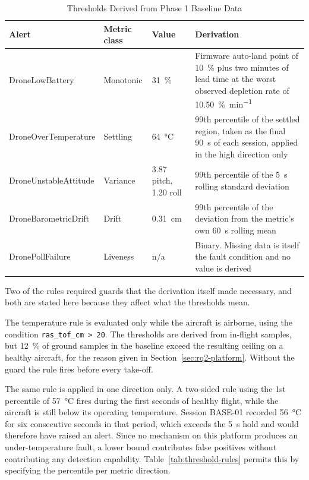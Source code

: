 \begin{table}[htbp]
\centering
\caption{Thresholds Derived from Phase 1 Baseline Data}
\label{tab:derived-thresholds}
\footnotesize
\begin{tabular}{|p{2.4cm}|p{2.2cm}|p{2.0cm}|p{6.4cm}|}
\hline
\textbf{Alert} & \textbf{Metric class} & \textbf{Value} & \textbf{Derivation} \\
\hline
DroneLowBattery & Monotonic & \SI{31}{\percent} &
Firmware auto-land point of \SI{10}{\percent} plus two minutes of lead time at
the worst observed depletion rate of \SI{10.50}{\percent\per\minute} \\
\hline
DroneOverTemperature & Settling & \SI{64}{\celsius} &
99th percentile of the settled region, taken as the final \SI{90}{\second} of
each session, applied in the high direction only \\
\hline
DroneUnstableAttitude & Variance & 3.87 pitch, 1.20 roll &
99th percentile of the \SI{5}{\second} rolling standard deviation \\
\hline
DroneBarometricDrift & Drift & \SI{0.31}{\centi\metre} &
99th percentile of the deviation from the metric's own \SI{60}{\second} rolling
mean \\
\hline
DronePollFailure & Liveness & n/a &
Binary. Missing data is itself the fault condition and no value is derived \\
\hline
\end{tabular}
\end{table}

Two of the rules required guards that the derivation itself made necessary, and
both are stated here because they affect what the thresholds mean.

The temperature rule is evaluated only while the aircraft is airborne, using the
condition \texttt{ras\_tof\_cm > 20}. The thresholds are derived from in-flight
samples, but \SI{12}{\percent} of ground samples in the baseline exceed the
resulting ceiling on a healthy aircraft, for the reason given in
Section~\ref{sec:rq2-platform}. Without the guard the rule fires before every
take-off.

The same rule is applied in one direction only. A two-sided rule using the 1st
percentile of \SI{57}{\celsius} fires during the first seconds of healthy flight,
while the aircraft is still below its operating temperature. Session BASE-01
recorded \SI{56}{\celsius} for six consecutive seconds in that period, which
exceeds the \SI{5}{\second} hold and would therefore have raised an alert. Since
no mechanism on this platform produces an under-temperature fault, a lower bound
contributes false positives without contributing any detection capability.
Table~\ref{tab:threshold-rules} permits this by specifying the percentile per
metric direction.

